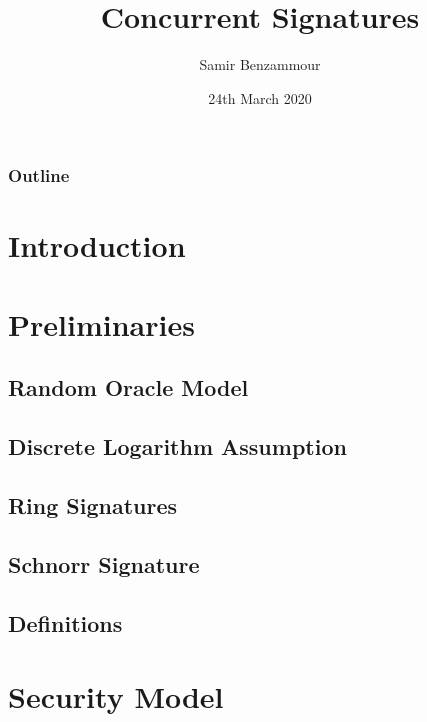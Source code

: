 \documentclass{beamer}
\title{Concurrent Signatures}
\author{Samir Benzammour}
\date{24th March 2020}
\institute[RWTH]{
  Algorithms and Computational Complexity\\
  RWTH Aachen University
}
\begin{document}
\frame{\titlepage}

\begin{frame}
	\frametitle{Outline}
	\tableofcontents
\end{frame}

\section{Introduction}


\section{Preliminaries}


\subsection{Random Oracle Model}


\subsection{Discrete Logarithm Assumption}


\subsection{Ring Signatures}


\subsection{Schnorr Signature}


\subsection{Definitions}


\section{Security Model}

\end{document}

